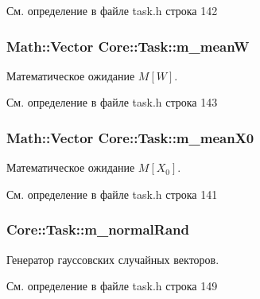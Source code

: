 См. определение в файле task.\+h строка 142

\subsubsection[{\texorpdfstring{m\+\_\+meanW}{m_meanW}}]{\setlength{\rightskip}{0pt plus 5cm}Math\+::\+Vector Core\+::\+Task\+::m\+\_\+meanW\hspace{0.3cm}{\ttfamily [protected]}}\hypertarget{class_core_1_1_task_a3391c29d286ebfae9e77cce5723f2e8c}{}\label{class_core_1_1_task_a3391c29d286ebfae9e77cce5723f2e8c}
Математическое ожидание $M[W]$. 

См. определение в файле task.\+h строка 143

\subsubsection[{\texorpdfstring{m\+\_\+mean\+X0}{m_meanX0}}]{\setlength{\rightskip}{0pt plus 5cm}Math\+::\+Vector Core\+::\+Task\+::m\+\_\+mean\+X0\hspace{0.3cm}{\ttfamily [protected]}}\hypertarget{class_core_1_1_task_a4482edff14b2fca2313e164614bb9693}{}\label{class_core_1_1_task_a4482edff14b2fca2313e164614bb9693}
Математическое ожидание $M[X_0]$. 

См. определение в файле task.\+h строка 141

\subsubsection[{\texorpdfstring{m\+\_\+normal\+Rand}{m_normalRand}}]{ Core\+::\+Task\+::m\+\_\+normal\+Rand\hspace{0.3cm}{\ttfamily [protected]}}\hypertarget{class_core_1_1_task_a02b059438d2e6adf4a2dc8add17b2d3f}{}\label{class_core_1_1_task_a02b059438d2e6adf4a2dc8add17b2d3f}
Генератор гауссовских случайных векторов. 

См. определение в файле task.\+h строка 149

